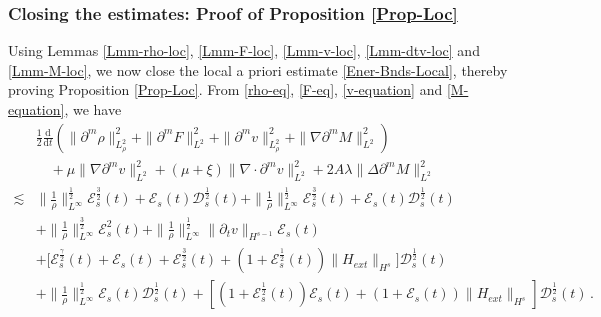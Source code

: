 \documentclass[reqno,11pt]{amsart}
\numberwithin{equation}{section}
\def\d{\mathrm{d}}
\begin{document}
\subsubsection{\bf Closing the estimates: Proof of Proposition \ref{Prop-Loc}}

Using Lemmas \ref{Lmm-rho-loc}, \ref{Lmm-F-loc}, \ref{Lmm-v-loc}, \ref{Lmm-dtv-loc} and \ref{Lmm-M-loc}, we now close the local a priori estimate \eqref{Ener-Bnds-Local}, thereby proving Proposition \ref{Prop-Loc}. From \eqref{rho-eq}, \eqref{F-eq}, \eqref{v-equation} and \eqref{M-equation}, we have
\begin{equation}\label{energy-eq1}
	\begin{aligned}
& \frac{1}{2}\frac{\d}{\d t}\left(\|\partial^m \rho\|_{L^2_\rho}^2 + \|\partial^m F\|_{L^2}^2 + \|\partial^m v\|_{L^2_\rho}^2 + \|\nabla \partial^m M\|_{L^2}^2\right) \\
& \quad + \mu \|\nabla \partial^m v\|_{L^2}^2 + (\mu + \xi) \|\nabla \cdot \partial^m v\|_{L^2}^2 + 2A\lambda \|\Delta \partial^m M\|_{L^2}^2\\
\lesssim & \|\tfrac{1}{\rho}\|^{\tfrac{1}{2}}_{L^\infty} \mathcal{E}_s^\frac{3}{2} (t) + \mathcal{E}_s (t) \mathcal{D}_s^\frac{1}{2} (t) + \|\tfrac{1}{\rho}\|^{\tfrac{1}{2}}_{L^\infty} \mathcal{E}_s^\frac{3}{2} (t) + \mathcal{E}_s (t) \mathcal{D}_s^\frac{1}{2} (t) \\
& + \| \frac{1}{\rho} \|_{L^\infty}^{\frac{3}{2}} \mathcal{E}_s^2 (t) + \| \frac{1}{\rho} \|_{L^\infty}^{\frac{1}{2}} \|\partial_t v\|_{H^{s - 1}} \mathcal{E}_s (t) \\
& + \big[ \mathcal{E}_s^\frac{\gamma}{2} (t) + \mathcal{E}_s (t) + \mathcal{E}_s^\frac{3}{2} (t) + ( 1 + \mathcal{E}_s^\frac{1}{2} (t) ) \|H_{ext}\|_{H^s} \big] \mathcal{D}_s^\frac{1}{2} (t) \\
& + \|\frac{1}{\rho}\|^{\frac{1}{2}}_{L^\infty} \mathcal{E}_s (t) \mathcal{D}_s^\frac{1}{2} (t) + \left[ ( 1 + \mathcal{E}_s^\frac{1}{2} (t) ) \mathcal{E}_s (t) + ( 1 + \mathcal{E}_s (t) ) \|H_{ext}\|_{H^s} \right] \mathcal{D}_s^\frac{1}{2} (t) \,.
	\end{aligned}
\end{equation}
\end{document}
